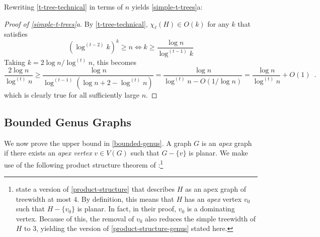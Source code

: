\documentclass[kpfonts]{patmorin}
\newcommand{\trn}{\chi_2}
\newcommand{\lrn}{\chi_{\ell}}
\theoremstyle{named}
\newcommand{\weirdref}[2]{\cref{#1}#2}
\begin{document}
%

Rewriting \cref{t-tree-technical} in terms of $n$ yields \weirdref{simple-t-trees}{a}:

\begin{proof}[Proof of \weirdref{simple-t-trees}{a}]
    By \cref{t-tree-technical}, $\lrn(H)\in O(k)$ for any $k$ that satisfies
    \[  (\log^{(t-2)} k)^{k} \ge n \Leftrightarrow
        k \ge \frac{\log n}{\log^{(t-1)} k}
    \]
    Taking $k=2\log n/\log^{(t)} n$, this becomes
    \[
        \frac{2\log n}{\log^{(t)} n}
        \ge \frac{\log n}{\log^{(t-1)}(\log n + 2 -\log^{(t)} n)}
        = \frac{\log n}{\log^{(t)} n - O(1/\log n)}
        = \frac{\log n}{\log^{(t)} n}+O(1) \enspace .
    \]
    which is clearly true for all sufficiently large $n$.
\end{proof}


\subsection{Bounded Genus Graphs}

We now prove the upper bound in \cref{bounded-genus}. A graph $G$ is an \emph{apex} graph if there exists an \emph{apex vertex} $v\in V(G)$ such that $G-\{v\}$ is planar. We make use of the following product structure theorem of \citet{dujmovic.joret.ea:planar}:\footnote{\citet{dujmovic.joret.ea:planar} state a version of \cref{product-structure} that describes $H$ as an apex graph of treewidth at most $4$.  By definition, this means that $H$ has an \emph{apex} vertex $v_0$ such that $H-\{v_0\}$ is planar.  In fact, in their proof, $v_0$ is a dominating vertex.  Because of this, the removal of $v_0$ also reduces the simple treewidth of $H$ to 3, yielding the version of \cref{product-structure-genus} stated here.}
\end{document}
